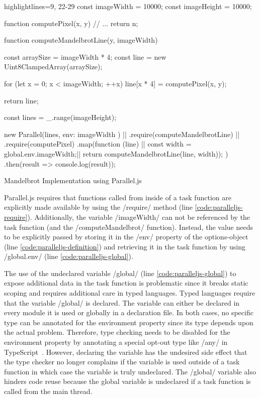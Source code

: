 \begin{listing}
	\begin{javascriptcode*}{highlightlines={9, 22-29}}
const imageWidth = 10000;
const imageHeight = 10000;

function computePixel(x, y) {
	// ...
	return n;
}

function computeMandelbrotLine(y, imageWidth) {
	const arraySize = imageWidth * 4;
	const line = new Uint8ClampedArray(arraySize);
	
	for (let x = 0; x < imageWidth; ++x) {
		line[x * 4] = computePixel(x, y);
	}
	
	return line;
}

const lines = _.range(imageHeight);

new Parallel(lines, {env: { imageWidth } }) |$\label{code:paralleljs-definition}$|
	.require(computeMandelbrotLine) |$\label{code:paralleljs-require}$|
	.require(computePixel)
	.map(function (line) { |$\label{code:paralleljs-map}$|
		const width = global.env.imageWidth;|$\label{code:paralleljs-global}$|
		return computeMandelbrotLine(line, width));
	})
	.then(result => console.log(result));
\end{javascriptcode*}

\caption{Mandelbrot Implementation using Parallel.js}
\label{fig:mandelbrot-paralleljs}
\end{listing}

Parallel.js requires that functions called from inside of a task function are explicitly made available by using the \javascriptinline/require/ method (line \ref{code:paralleljs-require}). Additionally, the variable \javascriptinline/imageWidth/ can not be referenced by the task function (and the \javascriptinline/computeMandelbrot/ function). Instead, the value needs to be explicitly passed by storing it in the \javascriptinline/env/ property of the options-object (line \ref{code:paralleljs-definition}) and retrieving it in the task function by using \javascriptinline/global.env/ (line \ref{code:paralleljs-global}).


The use of the undeclared variable \javascriptinline/global/ (line \ref{code:paralleljs-global}) to expose additional data in the task function is problematic since it breaks static scoping and requires additional care in typed languages. Typed languages require that the variable \javascriptinline/global/ is declared. The variable can either be declared in every module it is used or globally in a declaration file. In both cases, no specific type can be annotated for the environment property since its type depends upon the actual problem. Therefore, type checking needs to be disabled for the environment property by annotating a special opt-out type like \javascriptinline/any/ in TypeScript~\cite{typescript}. However, declaring the variable has the undesired side effect that the type checker no longer complains if the variable is used outside of a task function in which case the variable is truly undeclared. The \javascriptinline/global/ variable also hinders code reuse because the global variable is undeclared if a task function is called from the main thread.

